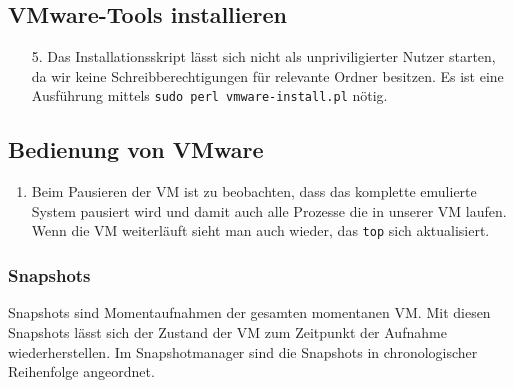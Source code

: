 \documentclass{scrartcl}
\begin{document}
    \subsection{VMware-Tools installieren}
    \label{sub:VMware-Tools installieren}

    \begin{enumerate}[1.]
      \item[5.] Das Installationsskript lässt sich nicht als unpriviligierter Nutzer starten, da
          wir keine Schreibberechtigungen für relevante Ordner besitzen. Es ist eine Ausführung
          mittels \texttt{sudo perl vmware-install.pl} nötig.
    \end{enumerate}

    \subsection{Bedienung von VMware}
    \label{sub:Bedienung von VMware}

    \begin{enumerate}[3.]
      \item Beim Pausieren der VM ist zu beobachten, dass das komplette emulierte
            System pausiert wird und damit auch alle Prozesse die in unserer VM
            laufen. Wenn die VM weiterläuft sieht man auch wieder, das \texttt{top}
            sich aktualisiert.
    \end{enumerate}

    \subsubsection{Snapshots}
    \label{subs:Snapshots}

    Snapshots sind Momentaufnahmen der gesamten momentanen VM. Mit diesen Snapshots
    lässt sich der Zustand der VM zum Zeitpunkt der Aufnahme wiederherstellen.
    Im Snapshotmanager sind die Snapshots in chronologischer Reihenfolge angeordnet.
\end{document}
